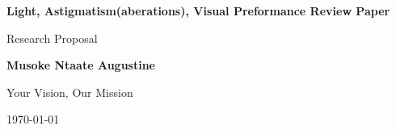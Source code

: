 
\begin{titlepage}
    \begin{center}
        \vspace*{1cm}
            
        \Huge
        \textbf{Light, Astigmatism(aberations), Visual Preformance Review Paper        }


        \vspace{0.5cm}
        \LARGE
        Research Proposal
            
        \vspace{1.5cm}
            
        \textbf{Musoke Ntaate Augustine\\}
            
        \vfill
            
       Your Vision, Our Mission\\
        
            
        \vspace{1.5cm}
        \vfill
            

        \vspace{0.5cm}
        \vfill
        
        \Large
        \today
            
    \end{center}
\end{titlepage}
    